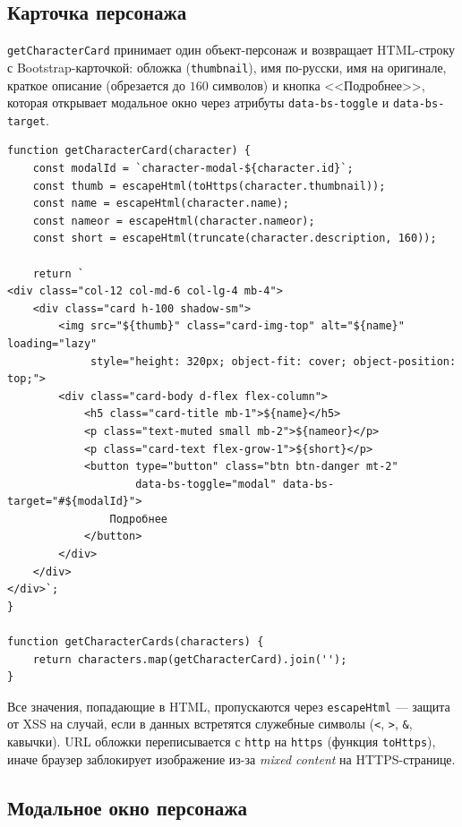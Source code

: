 \subsection{Карточка персонажа}

\texttt{getCharacterCard} принимает один объект-персонаж и возвращает
HTML-строку с Bootstrap-карточкой: обложка (\texttt{thumbnail}),
имя по-русски, имя на оригинале, краткое описание (обрезается до
\(160\) символов) и кнопка <<Подробнее>>, которая открывает модальное
окно через атрибуты \texttt{data-bs-toggle} и \texttt{data-bs-target}.

\begin{lstlisting}[caption={\texttt{getCharacterCard} --- HTML-карточка героя},captionpos=b]
function getCharacterCard(character) {
    const modalId = `character-modal-${character.id}`;
    const thumb = escapeHtml(toHttps(character.thumbnail));
    const name = escapeHtml(character.name);
    const nameor = escapeHtml(character.nameor);
    const short = escapeHtml(truncate(character.description, 160));

    return `
<div class="col-12 col-md-6 col-lg-4 mb-4">
    <div class="card h-100 shadow-sm">
        <img src="${thumb}" class="card-img-top" alt="${name}" loading="lazy"
             style="height: 320px; object-fit: cover; object-position: top;">
        <div class="card-body d-flex flex-column">
            <h5 class="card-title mb-1">${name}</h5>
            <p class="text-muted small mb-2">${nameor}</p>
            <p class="card-text flex-grow-1">${short}</p>
            <button type="button" class="btn btn-danger mt-2"
                    data-bs-toggle="modal" data-bs-target="#${modalId}">
                Подробнее
            </button>
        </div>
    </div>
</div>`;
}

function getCharacterCards(characters) {
    return characters.map(getCharacterCard).join('');
}
\end{lstlisting}

Все значения, попадающие в HTML, пропускаются через
\texttt{escapeHtml} --- защита от XSS на случай, если в данных
встретятся служебные символы (\texttt{<}, \texttt{>}, \texttt{\&},
кавычки). URL обложки переписывается с \texttt{http} на
\texttt{https} (функция \texttt{toHttps}), иначе браузер заблокирует
изображение из-за \textit{mixed content} на HTTPS-странице.

\subsection{Модальное окно персонажа}

